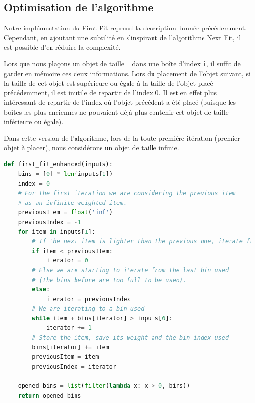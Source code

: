 \documentclass{article}
\begin{document}
\subsection{Optimisation de l'algorithme}
Notre implémentation du First Fit reprend la description donnée précédemment. Cependant, en ajoutant une subtilité en s'inspirant de l'algorithme Next Fit, il est possible d'en réduire la complexité.

Lors que nous plaçons un objet de taille \texttt{t} dans une boîte d'index \texttt{i}, il suffit de garder en mémoire ces deux informations.
Lors du placement de l'objet suivant, si la taille de cet objet est supérieure ou égale à la taille de l'objet placé précédemment,
il est inutile de repartir de l'index 0. Il est en effet plus intéressant de repartir de l'index où l'objet précédent a été placé (puisque les boîtes les plus anciennes ne pouvaient déjà plus contenir cet objet de taille inférieure ou égale).

Dans cette version de l'algorithme, lors de la toute première itération (premier objet à placer), nous considérons un objet de taille infinie.

\begin{lstlisting}[language=Python, frame=single]
def first_fit_enhanced(inputs):
    bins = [0] * len(inputs[1])
    index = 0
    # For the first iteration we are considering the previous item
    # as an infinite weighted item.
    previousItem = float('inf')
    previousIndex = -1
    for item in inputs[1]:
        # If the next item is lighter than the previous one, iterate from 0
        if item < previousItem:
            iterator = 0
        # Else we are starting to iterate from the last bin used
        # (the bins before are too full to be used).
        else:
            iterator = previousIndex
        # We are iterating to a bin used
        while item + bins[iterator] > inputs[0]:
            iterator += 1
        # Store the item, save its weight and the bin index used.
        bins[iterator] += item
        previousItem = item
        previousIndex = iterator

    opened_bins = list(filter(lambda x: x > 0, bins))
    return opened_bins
\end{lstlisting}


\end{document}
